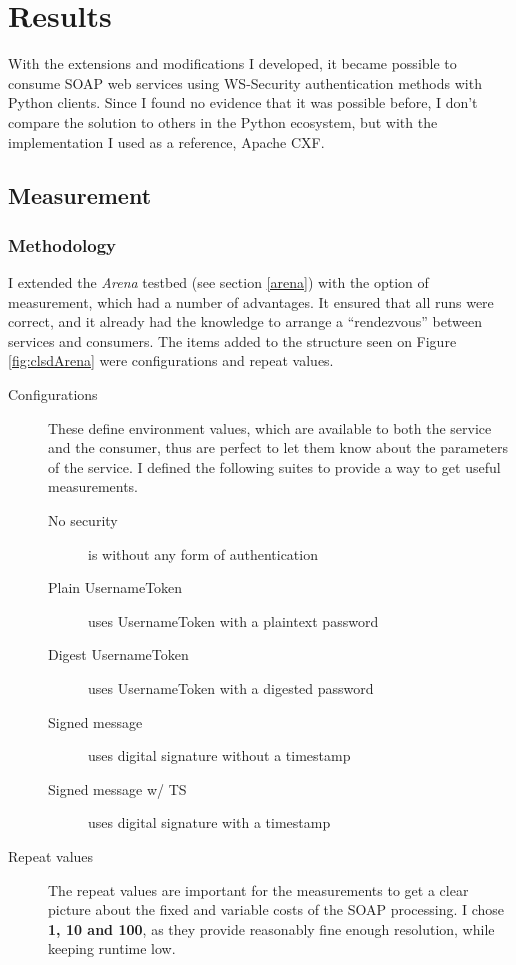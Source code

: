 \chapter{Results}

With the extensions and modifications I developed, it became possible to consume SOAP web services using WS-Security authentication methods with Python clients. Since I found no evidence that it was possible before, I don't compare the solution to others in the Python ecosystem, but with the implementation I used as a reference, Apache CXF.

\section{Measurement}

\subsection{Methodology}

I extended the \emph{Arena} testbed (see section \ref{arena}) with the option of measurement, which had a number of advantages. It ensured that all runs were correct, and it already had the knowledge to arrange a ``rendezvous'' between services and consumers. The items added to the structure seen on Figure \ref{fig:clsdArena} were configurations and repeat values.

\begin{description}
 \item[Configurations] These define environment values, which are available to both the service and the consumer, thus are perfect to let them know about the parameters of the service. I defined the following suites to provide a way to get useful measurements.
 \begin{description}
  \item[No security] is without any form of authentication
  \item[Plain UsernameToken] uses UsernameToken with a plaintext password
  \item[Digest UsernameToken] uses UsernameToken with a digested password
  \item[Signed message] uses digital signature without a timestamp
  \item[Signed message w/ TS] uses digital signature with a timestamp
 \end{description}
 \item[Repeat values] The repeat values are important for the measurements to get a clear picture about the fixed and variable costs of the SOAP processing. I chose \textbf{1, 10 and 100}, as they provide reasonably fine enough resolution, while keeping runtime low.
\end{description}

